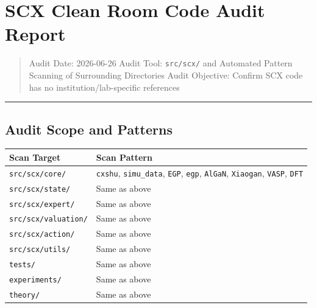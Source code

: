 \documentclass[
  12pt,
]{article}
\author{SCX}
\date{2026}
\begin{document}
\section{SCX Clean Room Code Audit Report}\label{scx-clean-room-code-audit-report}

\begin{quote}
Audit Date: 2026-06-26 \quad Audit Tool: \texttt{src/scx/}
and Automated Pattern Scanning of Surrounding Directories \quad Audit Objective: Confirm SCX code has no institution/lab-specific references
\end{quote}

\begin{center}\rule{0.5\linewidth}{0.5pt}\end{center}

\subsection{Audit Scope and Patterns}\label{audit-scope-and-patterns}

\begin{longtable}[]{@{}
  >{\raggedright\arraybackslash}p{}
  >{\raggedright\arraybackslash}p{}@{}}
\toprule\noalign{}
\begin{minipage}[b]{\linewidth}\raggedright
Scan Target
\end{minipage} & \begin{minipage}[b]{\linewidth}\raggedright
Scan Pattern
\end{minipage} \\
\midrule\noalign{}
\endhead
\bottomrule\noalign{}
\endlastfoot
\texttt{src/scx/core/} & \texttt{cxshu}, \texttt{simu\_data},
\texttt{EGP}, \texttt{egp}, \texttt{AlGaN}, \texttt{Xiaogan},
\texttt{VASP}, \texttt{DFT} \\
\texttt{src/scx/state/} & Same as above \\
\texttt{src/scx/expert/} & Same as above \\
\texttt{src/scx/valuation/} & Same as above \\
\texttt{src/scx/action/} & Same as above \\
\texttt{src/scx/utils/} & Same as above \\
\texttt{tests/} & Same as above \\
\texttt{experiments/} & Same as above \\
\texttt{theory/} & Same as above \\
\end{longtable}
\end{document}
